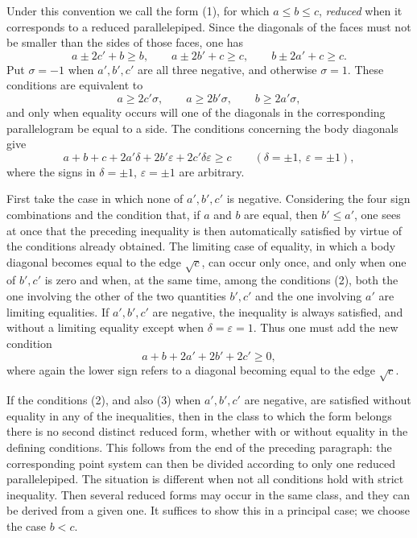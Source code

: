 \documentclass[11pt]{article}
\begin{document}
Under this convention we call the form (1), for which $a\le b\le c$, \emph{reduced} when it corresponds to a reduced parallelepiped. Since the diagonals of the faces must not be smaller than the sides of those faces, one has
\[
 a\pm2c'+b\ge b,
 \qquad a\pm2b'+c\ge c,
 \qquad b\pm2a'+c\ge c.
\]
Put $\sigma=-1$ when $a',b',c'$ are all three negative, and otherwise $\sigma=1$. These conditions are equivalent to
\begin{equation}
 a\ge 2c'\sigma,
 \qquad a\ge 2b'\sigma,
 \qquad b\ge 2a'\sigma,
\end{equation}
and only when equality occurs will one of the diagonals in the corresponding parallelogram be equal to a side. The conditions concerning the body diagonals give
\[
 a+b+c+2a'\delta+2b'\varepsilon+2c'\delta\varepsilon\ge c
 \qquad (\delta=\pm1,\ \varepsilon=\pm1),
\]
where the signs in $\delta=\pm1$, $\varepsilon=\pm1$ are arbitrary.

First take the case in which none of $a',b',c'$ is negative. Considering the four sign combinations and the condition that, if $a$ and $b$ are equal, then $b'\le a'$, one sees at once that the preceding inequality is then automatically satisfied by virtue of the conditions already obtained. The limiting case of equality, in which a body diagonal becomes equal to the edge $\sqrt c$, can occur only once, and only when one of $b',c'$ is zero and when, at the same time, among the conditions (2), both the one involving the other of the two quantities $b',c'$ and the one involving $a'$ are limiting equalities. If $a',b',c'$ are negative, the inequality is always satisfied, and without a limiting equality except when $\delta=\varepsilon=1$. Thus one must add the new condition
\begin{equation}
 a+b+2a'+2b'+2c'\ge0,
\end{equation}
where again the lower sign refers to a diagonal becoming equal to the edge $\sqrt c$.

If the conditions (2), and also (3) when $a',b',c'$ are negative, are satisfied without equality in any of the inequalities, then in the class to which the form belongs there is no second distinct reduced form, whether with or without equality in the defining conditions. This follows from the end of the preceding paragraph: the corresponding point system can then be divided according to only one reduced parallelepiped. The situation is different when not all conditions hold with strict inequality. Then several reduced forms may occur in the same class, and they can be derived from a given one. It suffices to show this in a principal case; we choose the case $b<c$.
\end{document}
